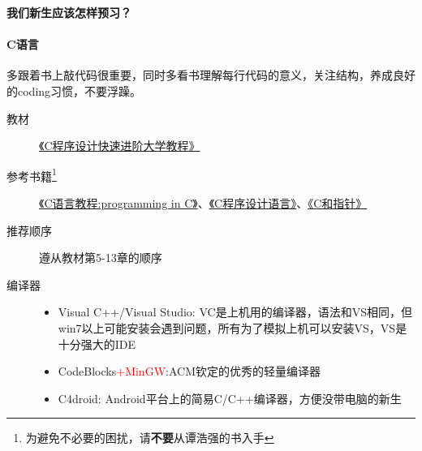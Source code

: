 \documentclass[presentation]{beamer}
\begin{document}
\begin{CJK*}{UTF8}{gbsn}
\begin{frame}{\textbf{我们新生应该怎样预习？}}
  \framesubtitle{C语言}
  \begin{block}{}
  多跟着书上敲代码很重要，同时多看书理解每行代码的意义，关注结构，养成良好的coding习惯，不要浮躁。
  \end{block}
  \begin{description}
    \item[教材] \href{http://opac.lib.dlut.edu.cn/opac/item.php?marc_no=2010028166}{《C程序设计快速进阶大学教程》}
    \item[参考书籍\footnote{为避免不必要的困扰，请\textbf{不要}从谭浩强的书入手}] \href{http://opac.lib.dlut.edu.cn/opac/item.php?marc_no=2007039426}{《C语言教程:programming in C》}、\href{http://opac.lib.dlut.edu.cn/opac/item.php?marc_no=2003046536}{《C程序设计语言》}、\href{http://opac.lib.dlut.edu.cn/opac/item.php?marc_no=2008007312}{《C和指针》} 
    \item[推荐顺序] 遵从教材第5-13章的顺序 
    \item[编译器] 
    \begin{itemize}
     \item Visual C++/Visual Studio: VC是上机用的编译器，语法和VS相同，但win7以上可能安装会遇到问题，所有为了模拟上机可以安装VS，VS是十分强大的IDE
     \item CodeBlocks\textcolor{red}{+MinGW}:ACM钦定的优秀的轻量编译器
     \item C4droid: Android平台上的简易C/C++编译器，方便没带电脑的新生
    \end{itemize}
  \end{description}
\end{frame}


\end{CJK*}
\end{document}
